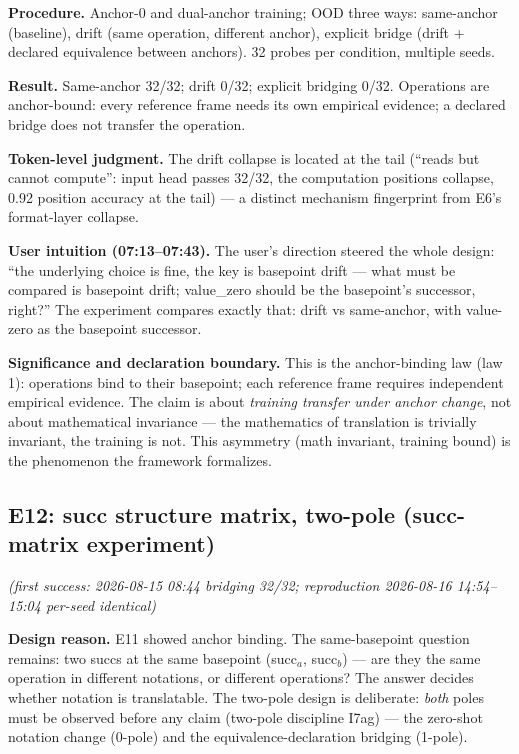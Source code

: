 \documentclass[sigplan,10pt,anonymous,review]{acmart}
\begin{document}
\textbf{Procedure.} Anchor-0 and dual-anchor training; OOD three ways:
same-anchor (baseline), drift (same operation, different anchor), explicit
bridge (drift + declared equivalence between anchors). 32 probes per
condition, multiple seeds.

\textbf{Result.} Same-anchor 32/32; drift 0/32; explicit bridging 0/32.
Operations are anchor-bound: every reference frame needs its own
empirical evidence; a declared bridge does not transfer the operation.

\textbf{Token-level judgment.} The drift collapse is located at the tail
(``reads but cannot compute'': input head passes 32/32, the computation
positions collapse, 0.92 position accuracy at the tail) --- a distinct
mechanism fingerprint from E6's format-layer collapse.

\textbf{User intuition (07:13--07:43).} The user's direction steered the
whole design: ``the underlying choice is fine, the key is basepoint drift
--- what must be compared is basepoint drift; value\_zero should be the
basepoint's successor, right?'' The experiment compares exactly that:
drift vs same-anchor, with value-zero as the basepoint successor.

\textbf{Significance and declaration boundary.} This is the anchor-binding
law (law 1): operations bind to their basepoint; each reference frame
requires independent empirical evidence. The claim is about \emph{training
transfer under anchor change}, not about mathematical invariance --- the
mathematics of translation is trivially invariant, the training is not.
This asymmetry (math invariant, training bound) is the phenomenon the
framework formalizes.

\subsection{E12: succ structure matrix, two-pole (succ-matrix experiment)}\hfill\textit{(first success: 2026-08-15 08:44 bridging 32/32; reproduction 2026-08-16 14:54--15:04 per-seed identical)}

\textbf{Design reason.} E11 showed anchor binding. The same-basepoint
question remains: two succs at the same basepoint (succ$_a$, succ$_b$) ---
are they the same operation in different notations, or different
operations? The answer decides whether notation is translatable. The
two-pole design is deliberate: \emph{both} poles must be observed before
any claim (two-pole discipline I7ag) --- the zero-shot notation change
(0-pole) and the equivalence-declaration bridging (1-pole).
\end{document}
